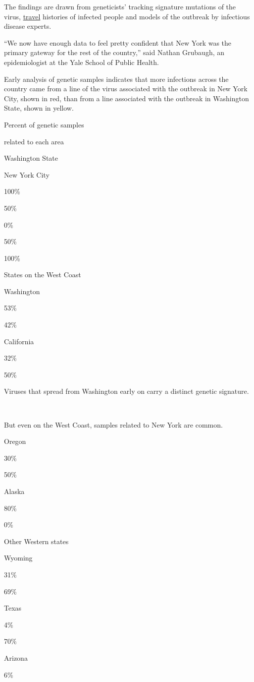 The findings are drawn from geneticists' tracking signature mutations of
the virus,
\href{https://www.nytimes.com/2020/07/16/travel/virus-vacation.html}{travel}
histories of infected people and models of the outbreak by infectious
disease experts.

``We now have enough data to feel pretty confident that New York was the
primary gateway for the rest of the country,'' said Nathan Grubaugh, an
epidemiologist at the Yale School of Public Health.

Early analysis of genetic samples indicates that more infections across
the country came from a line of the virus associated with the outbreak
in New York City, shown in red, than from a line associated with the
outbreak in Washington State, shown in yellow.

Percent of genetic samples

related to each area

Washington State

New York City

100\%

50\%

0\%

50\%

100\%

States on the West Coast

Washington

53\%

42\%

California

32\%

50\%

Viruses that spread from Washington early on carry a distinct genetic
signature.

~

But even on the West Coast, samples related to New York are common.

Oregon

30\%

50\%

Alaska

80\%

0\%

Other Western states

Wyoming

31\%

69\%

Texas

4\%

70\%

Arizona

6\%

